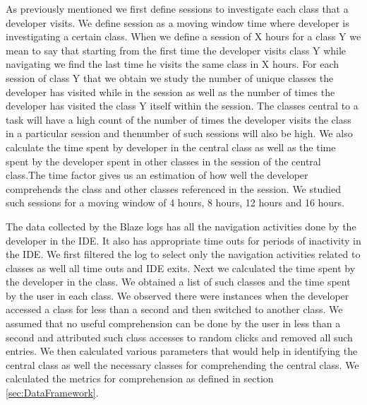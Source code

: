 As previously mentioned we first define sessions to investigate each class that a developer visits. We define session as a moving window time where developer is investigating a certain class. 
When we define a session of X hours for a class Y we mean to say that starting from the first time the developer visits class Y while navigating we find the last time he visits the same class in X hours. For each session of class Y that we obtain we study the number of unique classes the developer has visited while in the session as well as the number of times the developer has visited the class Y itself within the session. 
The classes central to a task will have a high count of the number of times the developer visits the class in a particular session and thenumber of such sessions will also be high. We also calculate the time spent by developer in the central class as well as the time spent by the developer spent in other classes in the session of the central class.The time factor gives us an estimation of how well the developer comprehends the class and other classes referenced in the session. We studied such sessions for a moving window of 4 hours, 8 hours, 12 hours and 16 hours. 

The data collected by the Blaze logs has all the navigation activities done by the developer in the IDE. It also has appropriate time outs for periods of inactivity in the IDE. We first filtered the log to select only the navigation activities related to classes as well all time outs and IDE exits. Next we calculated the time spent by the developer in the class. We obtained a list of such classes and the time spent by the user in each class. We observed there were instances when the developer accessed a class for less than a second and then switched to another class. We assumed that no useful comprehension can be done by the user in less than a second and attributed such class accesses to random clicks and removed all such entries. We then calculated various parameters that would help in identifying the central class as well the necessary classes for comprehending the central class.   We calculated the metrics for comprehension as defined in section \ref{sec:DataFramework}.

